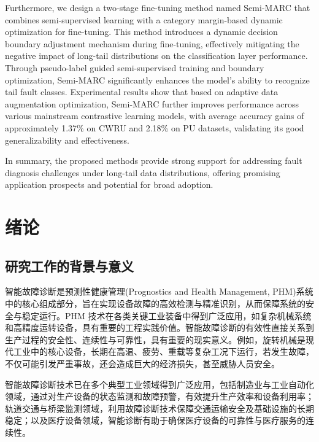 \documentclass[master]{thesis-uestc}
\begin{document}
\begin{englishabstract}
    Furthermore, we design a two-stage fine-tuning method named Semi-MARC that combines semi-supervised learning with a category margin-based dynamic optimization for fine-tuning. This method introduces a dynamic decision boundary adjustment mechanism during fine-tuning, effectively mitigating the negative impact of long-tail distributions on the classification layer performance. Through pseudo-label guided semi-supervised training and boundary optimization, Semi-MARC significantly enhances the model’s ability to recognize tail fault classes. Experimental results show that based on adaptive data augmentation optimization, Semi-MARC further improves performance across various mainstream contrastive learning models, with average accuracy gains of approximately 1.37\% on CWRU and 2.18\% on PU datasets, validating its good generalizability and effectiveness.

    In summary, the proposed methods provide strong support for addressing fault diagnosis challenges under long-tail data distributions, offering promising application prospects and potential for broad adoption.

\end{englishabstract}

\thesistableofcontents

\chapter{绪\hspace{6pt}论}

\section{研究工作的背景与意义}

智能故障诊断是预测性健康管理(Prognostics and Health Management, PHM)系统中的核心组成部分，旨在实现设备故障的高效检测与精准识别，从而保障系统的安全与稳定运行。PHM 技术在各类关键工业装备中得到广泛应用，如复杂机械系统和高精度运转设备，具有重要的工程实践价值。智能故障诊断的有效性直接关系到生产过程的安全性、连续性与可靠性，具有重要的现实意义。例如，旋转机械是现代工业中的核心设备，长期在高温、疲劳、重载等复杂工况下运行，若发生故障，不仅可能引发严重事故，还会造成巨大的经济损失，甚至威胁人员安全。

智能故障诊断技术已在多个典型工业领域得到广泛应用，包括制造业与工业自动化领域，通过对生产设备的状态监测和故障预警，有效提升生产效率和设备利用率；轨道交通与桥梁监测领域，利用故障诊断技术保障交通运输安全及基础设施的长期稳定；以及医疗设备领域，智能诊断有助于确保医疗设备的可靠性与医疗服务的连续性。
\end{document}
